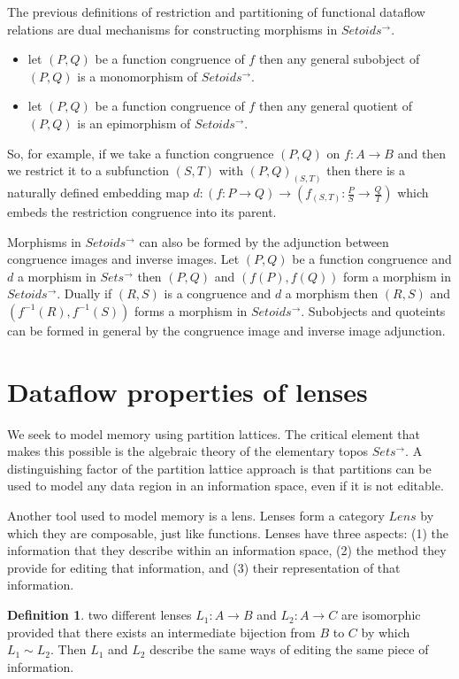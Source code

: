 \documentclass[a4paper,11pt, notitlepage]{report}
\theoremstyle{definition}
\newtheorem{definition}{Definition}[section]
\begin{document}
The previous definitions of restriction and partitioning of functional dataflow relations are dual mechanisms for constructing morphisms in $Setoids^{\to}$.

\begin{itemize}
 \item let $(P,Q)$ be a function congruence of $f$ then any general subobject of $(P,Q)$ is a monomorphism of $Setoids^{\to}$.
 \item let $(P,Q)$ be a function congruence of $f$ then any general quotient of $(P,Q)$ is an epimorphism of $Setoids^{\to}$.
\end{itemize}

So, for example, if we take a function congruence $(P,Q)$ on $f: A \to B$ and then we restrict it to a subfunction $(S,T)$ with $(P,Q)_{(S,T)}$ then there is a naturally defined embedding map $d: (f: P \to Q) \to (f_{(S,T)} : \frac{P}{S} \to \frac{Q}{T})$ which embeds the restriction congruence into its parent.

Morphisms in $Setoids^{\to}$ can also be formed by the adjunction between congruence images and inverse images. Let $(P,Q)$ be a function congruence and $d$ a morphism in $Sets^{\to}$ then $(P,Q)$ and $(f(P),f(Q))$ form a morphism in $Setoids^{\to}$. Dually if $(R,S)$ is a congruence and $d$ a morphism then $(R,S)$ and $(f^{-1}(R), f^{-1}(S))$ forms a morphism in $Setoids^{\to}$. Subobjects and quoteints can be formed in general by the congruence image and inverse image adjunction.

\newpage

\section{Dataflow properties of lenses}
We seek to model memory using partition lattices. The critical element that makes this possible is the algebraic theory of the elementary topos $Sets^{\to}$. A distinguishing factor of the partition lattice approach is that partitions can be used to model any data region in an information space, even if it is not editable.

Another tool used to model memory is a lens. Lenses form a category $Lens$ by which they are composable, just like functions. Lenses have three aspects: (1) the information that they describe within an information space, (2) the method they provide for editing that information, and (3) their representation of that information.

\begin{definition}
two different lenses $L_1: A \to B$ and $L_2 : A \to C$ are isomorphic provided that there exists an intermediate bijection from $B$ to $C$ by which $L_1 \sim L_2$. Then $L_1$ and $L_2$ describe the same ways of editing the same piece of information.
\end{definition}
\end{document}
